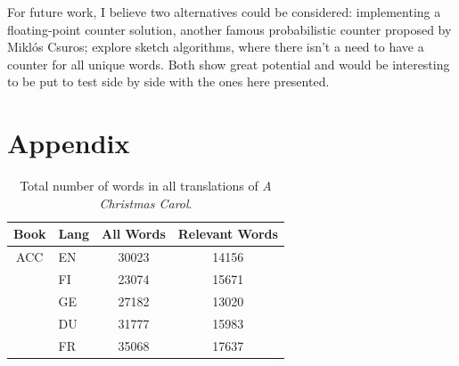 \documentclass[shortpaper]{revdetua}
\begin{document}
For future work, I believe two alternatives could be considered: implementing 
a floating-point counter solution, another famous probabilistic counter proposed 
by Miklós Csuros; explore sketch algorithms, where there isn't a need to have a 
counter for all unique words.
Both show great potential and would be interesting to be put to test side by side 
with the ones here presented.
\newpage


 
\vspace{91pt}

\section*{Appendix}

\begin{table}[H]
\begin{tabular}{@{}cccc@{}}
\toprule
\textbf{Book} & \multicolumn{1}{l|}{\textbf{Lang}} & \textbf{All Words} & \textbf{Relevant Words} \\ \midrule
ACC & \multicolumn{1}{l|}{EN} & 30023     & 14156          \\
    & \multicolumn{1}{l|}{FI} & 23074     & 15671          \\
    & \multicolumn{1}{l|}{GE} & 27182     & 13020          \\
    & \multicolumn{1}{l|}{DU} & 31777     & 15983          \\
    & \multicolumn{1}{l|}{FR} & 35068     & 17637          \\ \bottomrule
\end{tabular}
\caption{Total number of words in all translations of \textit{A Christmas Carol}.}
\end{table}
\newpage
\end{document}
